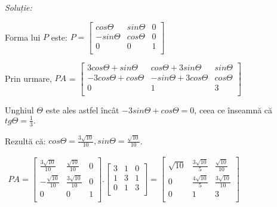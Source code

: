 \documentclass{exam}
\begin{document}
\textit{Soluție:}

Forma lui $P$ este:
$
	P=
	\left [\begin{array}{ccc}
			cos\Theta  & sin\Theta & 0 \\
			-sin\Theta & cos\Theta & 0 \\
			0          & 0         & 1 \\
		\end{array} \right] $


Prin urmare,  $PA$  =
$\left [\begin{array}{ccc}
			3cos\Theta + sin\Theta   & cos\Theta + 3sin\Theta  & sin\Theta \\
			-3cos\Theta + cos \Theta & -sin\Theta + 3cos\Theta & cos\Theta \\
			0                        & 1                       & 3         \\
		\end{array} \right]
$

Unghiul $\Theta$ este ales astfel încât $-3sin\Theta + cos\Theta = 0$, ceea ce înseamnă că $tg\Theta = \frac{1}{3}.$

Rezultă că:
$cos\Theta = \frac{3\sqrt{10}}{10},  sin\Theta = \frac{\sqrt{10}}{10}$.

$\begin{array}{ccccccc}
		PA  =
		\left[\begin{array}{ccc}
				      \frac{3\sqrt{10}}{10} & \frac{\sqrt{10}}{10}  & 0 \\
				      -\frac{\sqrt{10}}{10} & \frac{3\sqrt{10}}{10} & 0 \\
				      0                     & 0                     & 1 \\
			      \end{array}\right] .
		\left[\begin{array}{ccc}
				      3 & 1 & 0 \\
				      1 & 3 & 1 \\
				      0 & 1 & 3 \\
			      \end{array}\right] =
		\left[\begin{array}{ccc}
				      \sqrt{10} & \frac{3\sqrt{10}}{5} & \frac{\sqrt{10}}{10}  \\
				      0         & \frac{4\sqrt{10}}{5} & \frac{3\sqrt{10}}{10} \\
				      0         & 1                    & 3                     \\
			      \end{array}\right]
	\end{array}
$
\end{document}
